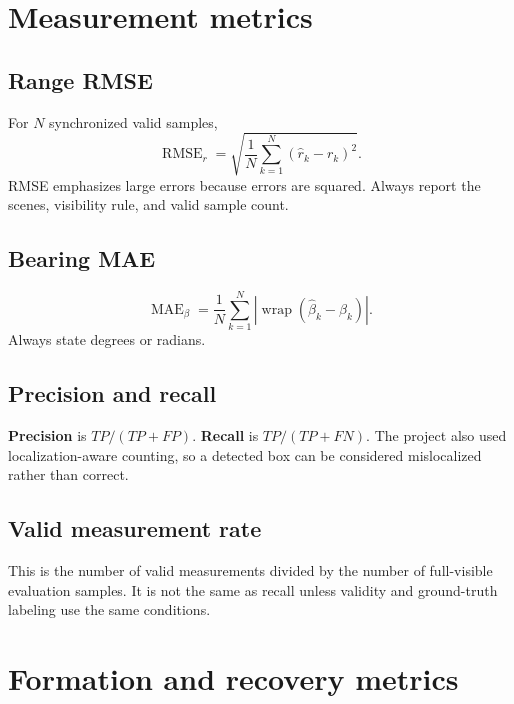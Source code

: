 \documentclass[11pt,oneside,openany]{book}
\newcommand{\term}[1]{\textbf{#1}\index{#1}}
\begin{document}
\chapter{Measurement metrics}

\section{Range RMSE}

For $N$ synchronized valid samples,
\begin{equation}
\operatorname{RMSE}_r=\sqrt{\frac{1}{N}\sum_{k=1}^N(\hat r_k-r_k)^2}.
\end{equation}
RMSE emphasizes large errors because errors are squared. Always report the scenes, visibility rule, and valid sample count.

\section{Bearing MAE}

\begin{equation}
\operatorname{MAE}_\beta=\frac{1}{N}\sum_{k=1}^N\left|\operatorname{wrap}(\hat\beta_k-\beta_k)\right|.
\end{equation}
Always state degrees or radians.

\section{Precision and recall}

\term{Precision} is $TP/(TP+FP)$. \term{Recall} is $TP/(TP+FN)$. The project also used localization-aware counting, so a detected box can be considered mislocalized rather than correct.

\section{Valid measurement rate}

This is the number of valid measurements divided by the number of full-visible evaluation samples. It is not the same as recall unless validity and ground-truth labeling use the same conditions.

\chapter{Formation and recovery metrics}
\end{document}
